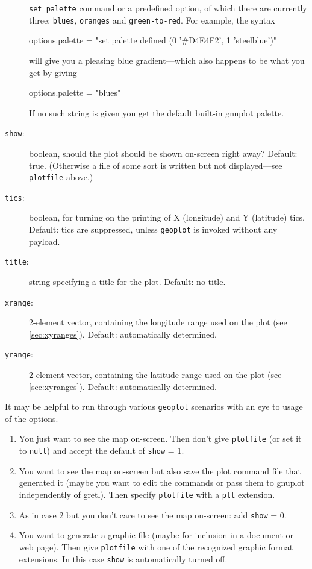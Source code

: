 \documentclass{article}
\begin{document}
\begin{description}
  \texttt{set palette} command or a predefined option, of which there
  are currently three: \texttt{blues}, \texttt{oranges} and
  \texttt{green-to-red}. For example, the syntax
  \begin{code}
    options.palette = "set palette defined (0 '#D4E4F2', 1 'steelblue')"
  \end{code}
  will give you a pleasing blue gradient---which also happens to be
  what you get by giving
  \begin{code}
    options.palette = "blues"
  \end{code}
  If no such string is given you get the default built-in
  \textsf{gnuplot} palette.
\item[\texttt{show}:] boolean, should the plot should be shown
  on-screen right away? Default: true. (Otherwise a file of some sort
  is written but not displayed---see \texttt{plotfile} above.)
\item[\texttt{tics}:] boolean, for turning on the printing of X
  (longitude) and Y (latitude) tics. Default: tics are suppressed,
  unless \texttt{geoplot} is invoked without any payload.
\item[\texttt{title}:] string specifying a title for the
  plot. Default: no title.
\item[\texttt{xrange}:] 2-element vector, containing the longitude
  range used on the plot (see \ref{sec:xyranges}). Default:
  automatically determined.
\item[\texttt{yrange}:] 2-element vector, containing the latitude
  range used on the plot (see \ref{sec:xyranges}). Default:
  automatically determined.
\end{description}

It may be helpful to run through various \texttt{geoplot} scenarios
with an eye to usage of the options.

\begin{enumerate}
\item You just want to see the map on-screen. Then don't give
  \texttt{plotfile} (or set it to \texttt{null}) and accept the
  default of \texttt{show} = 1.\label{just-see}
\item You want to see the map on-screen but also save the plot command
  file that generated it (maybe you want to edit the commands or pass
  them to \textsf{gnuplot} independently of gretl). Then specify
  \texttt{plotfile} with a \texttt{plt} extension.\label{see-and-save}
\item As in case 2 but you don't care to see the map on-screen: add
  \texttt{show} = 0.
\item You want to generate a graphic file (maybe for inclusion in a
  document or web page). Then give \texttt{plotfile} with one of the
  recognized graphic format extensions. In this case \texttt{show} is
  automatically turned off.
\end{enumerate}
\end{document}
